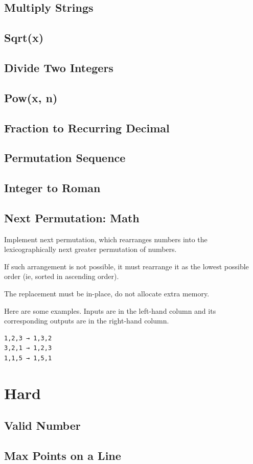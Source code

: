 \documentclass[12pt]{book}
\begin{document}
\subsection{Multiply Strings}
\label{sec-21-2-1}
\subsection{Sqrt(x)}
\label{sec-21-2-2}
\subsection{Divide Two Integers}
\label{sec-21-2-3}
\subsection{Pow(x, n)}
\label{sec-21-2-4}
\subsection{Fraction to Recurring Decimal}
\label{sec-21-2-5}
\subsection{Permutation Sequence}
\label{sec-21-2-6}
\subsection{Integer to Roman}
\label{sec-21-2-7}
\subsection{Next Permutation: Math}
\label{sec-21-2-8}
Implement next permutation, which rearranges numbers into the lexicographically next greater permutation of numbers.

If such arrangement is not possible, it must rearrange it as the lowest possible order (ie, sorted in ascending order).

The replacement must be in-place, do not allocate extra memory.

Here are some examples. Inputs are in the left-hand column and its
corresponding outputs are in the right-hand column.
\lstset{language=java,label= ,caption= ,numbers=none}
\begin{lstlisting}
1,2,3 → 1,3,2
3,2,1 → 1,2,3
1,1,5 → 1,5,1
\end{lstlisting}

\section{Hard}
\label{sec-21-3}
\subsection{Valid Number}
\label{sec-21-3-1}
\subsection{Max Points on a Line}
\label{sec-21-3-2}
\end{document}
